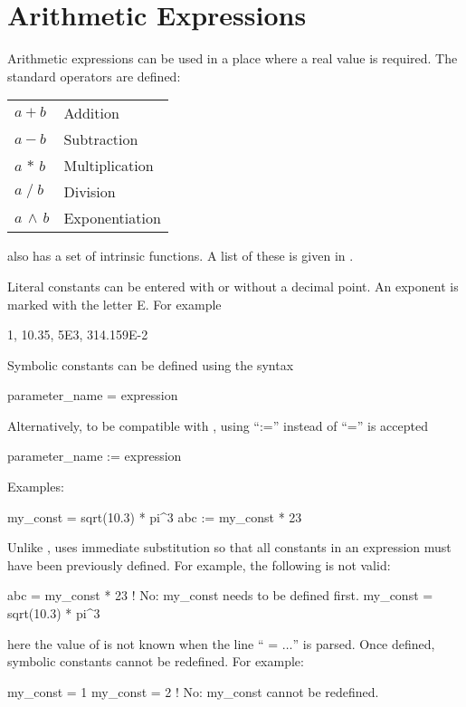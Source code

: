 {{%
\section{Arithmetic Expressions}

Arithmetic expressions can be used in a place where a real value is required.
The standard operators are defined: \hfil\break
\hspace*{0.15in}
\begin{tabular}{ll}
  $a + b$           & Addition        \\
  $a - b$           & Subtraction     \\
  $a \, \ast \, b$  & Multiplication  \\
  $a \; / \; b$     & Division        \\
  $a \, \land \, b$ & Exponentiation  \\
\end{tabular}
\hfil\break
\bmad also has a set of intrinsic functions. A list of these is given
in .

Literal constants can be entered with or without a decimal point. An
exponent is marked with the letter E. For example
\begin{example}
  1, 10.35, 5E3, 314.159E-2
\end{example}
Symbolic constants can be defined using the syntax
\begin{example}
  parameter_name = expression
\end{example}
Alternatively, to be compatible with \mad, using ``:='' instead of ``='' is accepted
\begin{example}
  parameter_name := expression
\end{example}
Examples:
\begin{example}
  my_const = sqrt(10.3) * pi^3
  abc     := my_const * 23
\end{example}
Unlike \mad, \bmad uses immediate substitution so that all constants
in an expression must have been previously defined. For example, the
following is not valid:
\begin{example}
  abc      = my_const * 23      ! No: my_const needs to be defined first.
  my_const = sqrt(10.3) * pi^3
\end{example}
here the value of  is not known when the line ``
= $\ldots$'' is parsed. Once
defined, symbolic constants cannot be redefined. For example:
\begin{example}
  my_const = 1
  my_const = 2  ! No: my_const cannot be redefined.
\end{example}

}}
